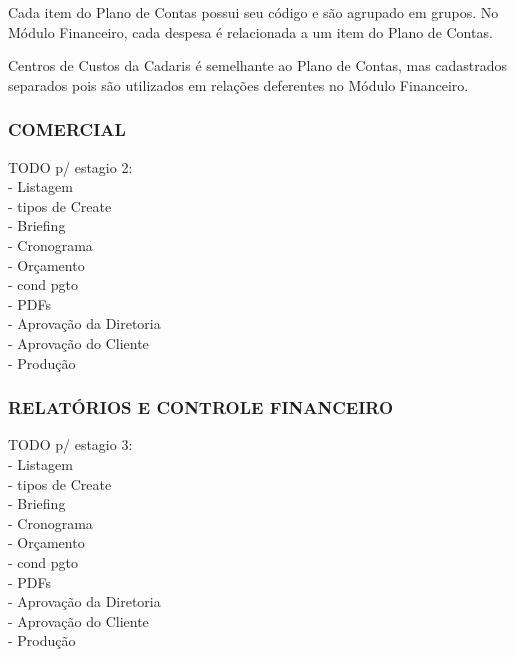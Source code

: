 \documentclass[
  12pt,				%
  openany,
  oneside,
  a4paper,			%
  english,			%
  brazil
]{article}
\numberwithin{figure}{section}
\numberwithin{table}{section}
\newcounter{subsubsubsection}[subsubsection]
\begin{document}
Cada item do Plano de Contas possui seu código e são agrupado em grupos. No Módulo Financeiro, cada despesa é relacionada a um item do Plano de Contas.



Centros de Custos da Cadaris é semelhante ao Plano de Contas, mas cadastrados separados pois são utilizados em relações deferentes no Módulo Financeiro.


  \subsubsection{COMERCIAL}
  \label{sec:2.3.2}
  \noindent TODO p/ estagio 2: \\
  - Listagem \\
  - tipos de Create \\
  - Briefing \\
  - Cronograma \\
  - Orçamento \\
  - cond pgto \\
  - PDFs \\
  - Aprovação da Diretoria \\
  - Aprovação do Cliente \\
  - Produção

  \subsubsection{RELATÓRIOS E CONTROLE FINANCEIRO}
  \noindent TODO p/ estagio 3: \\
  - Listagem \\
  - tipos de Create \\
  - Briefing \\
  - Cronograma \\
  - Orçamento \\
  - cond pgto \\
  - PDFs \\
  - Aprovação da Diretoria \\
  - Aprovação do Cliente \\
  - Produção



\end{document}
